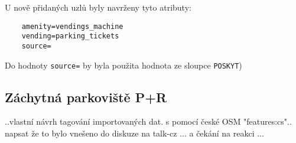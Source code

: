 U nově přidaných uzlů byly navrženy tyto atributy:
\begin{verbatim}
    amenity=vendings_machine
    vending=parking_tickets
    source=
\end{verbatim}
Do hodnoty {\tt source=} by byla použita hodnota ze sloupce {\tt POSKYT}) 


\subsection{Záchytná parkoviště P+R}
\label{Záchytná parkoviště P+R}

..vlastní návrh tagování importovaných dat. s pomocí české OSM "features:cs"..
napsat že to bylo vnešeno do diskuze na talk-cz ... a čekání na reakci ...
 


